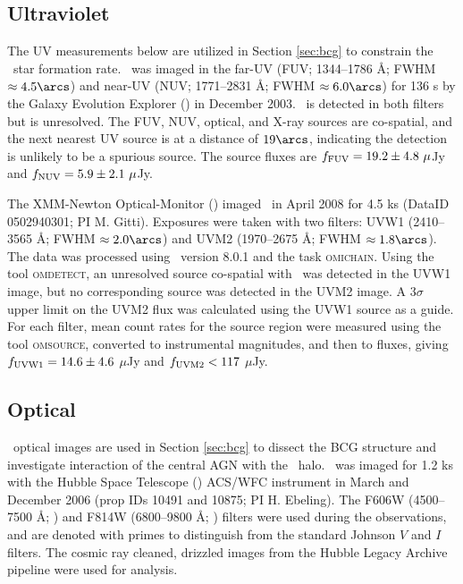 \documentclass{emulateapj}
\begin{document}
\subsection{Ultraviolet}

The UV measurements below are utilized in Section \ref{sec:bcg} to
constrain the \rbs\ star formation rate. \rbs\ was imaged in the
far-UV (FUV; 1344--1786 \AA; FWHM $\approx 4.5\arcs$) and near-UV
(NUV; 1771--2831 \AA; FWHM $\approx 6.0\arcs$) for 136 s by the Galaxy
Evolution Explorer (\galex) in December 2003. \rbs\ is detected in
both filters but is unresolved. The FUV, NUV, optical, and X-ray
sources are co-spatial, and the next nearest UV source is at a
distance of $19\arcs$, indicating the detection is unlikely to be a
spurious source. The source fluxes are $f_{\rm{FUV}} = 19.2 \pm 4.8
~\mu$Jy and $f_{\rm{NUV}} = 5.9 \pm 2.1 ~\mu$Jy.

The XMM-Newton Optical-Monitor (\xom) imaged \rbs\ in April 2008 for
4.5 ks (DataID 0502940301; PI M. Gitti). Exposures were taken with two
filters: UVW1 (2410--3565 \AA; FWHM $\approx 2.0\arcs$) and UVM2
(1970--2675 \AA; FWHM $\approx 1.8\arcs$). The data was processed
using \sas\ version 8.0.1 and the task {\textsc{omichain}}. Using the
tool {\textsc{omdetect}}, an unresolved source co-spatial with
\rbs\ was detected in the UVW1 image, but no corresponding source was
detected in the UVM2 image. A $3\sigma$ upper limit on the UVM2 flux
was calculated using the UVW1 source as a guide. For each filter, mean
count rates for the source region were measured using the tool
{\textsc{omsource}}, converted to instrumental magnitudes, and then to
fluxes, giving $f_{\rm{UVW1}} = 14.6 \pm 4.6$ $\mu$Jy and
$f_{\rm{UVM2}} < 117$ $\mu$Jy.

\subsection{Optical}

\hst\ optical images are used in Section \ref{sec:bcg} to dissect the
BCG structure and investigate interaction of the central AGN with the
\rbs\ halo. \rbs\ was imaged for 1.2 ks with the Hubble Space
Telescope (\hst) ACS/WFC instrument in March and December 2006 (prop
IDs 10491 and 10875; PI H. Ebeling). The F606W (4500--7500 \AA; \myv)
and F814W (6800--9800 \AA; \myi) filters were used during the
observations, and are denoted with primes to distinguish from the
standard Johnson $V$ and $I$ filters. The cosmic ray cleaned, drizzled
images from the Hubble Legacy Archive pipeline were used for
analysis.
\end{document}
